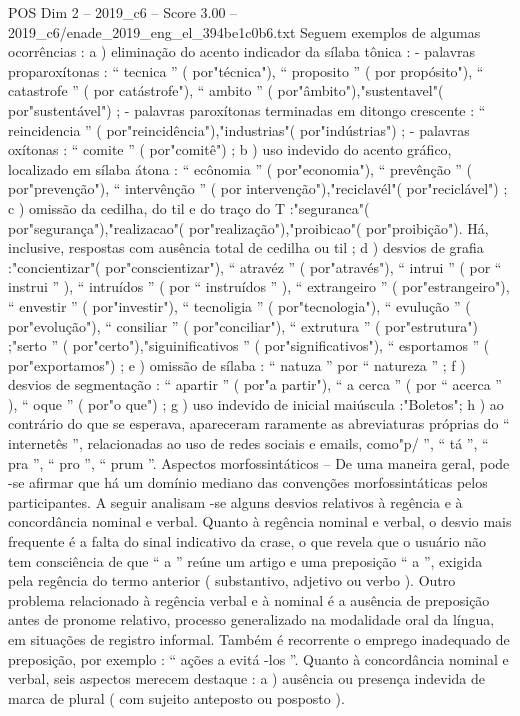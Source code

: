 \begin{textsample}{POS Dim 2 – 2019\_c6 – Score 3.00 – 2019\_c6/enade\_2019\_eng\_el\_394be1c0b6.txt}
Seguem exemplos de algumas ocorrências : a ) eliminação do acento indicador da sílaba tônica : - palavras proparoxítonas : “ tecnica ” ( por"técnica"), “ proposito ” ( por propósito"), “ catastrofe ” ( por catástrofe"), “ ambito ” ( por"âmbito"),"sustentavel"( por"sustentável") ; - palavras paroxítonas terminadas em ditongo crescente : “ reincidencia ” ( por"reincidência"),"industrias"( por"indústrias") ; - palavras oxítonas : “ comite ” ( por"comitê") ; b ) uso indevido do acento gráfico, localizado em sílaba átona : “ ecônomia ” ( por"economia"), “ prevênção ” ( por"prevenção"), “ intervênção ” ( por intervenção"),"reciclavél"( por"reciclável") ; c ) omissão da cedilha, do til e do traço do T :"seguranca"( por"segurança"),"realizacao"( por"realização"),"proibicao"( por"proibição").
Há, inclusive, respostas com ausência total de cedilha ou til ; d ) desvios de grafia :"concientizar"( por"conscientizar"), “ atravéz ” ( por"através"), “ intrui ” ( por “ instrui ” ), “ intruídos ” ( por “ instruídos ” ), “ extrangeiro ” ( por"estrangeiro"), “ envestir ” ( por"investir"), “ tecnoligia ” ( por"tecnologia"), “ evulução ” ( por"evolução"), “ consiliar ” ( por"conciliar"), “ extrutura ” ( por"estrutura") ;"serto ” ( por"certo"),"siguinificativos ” ( por"significativos"), “ esportamos ” ( por"exportamos") ; e ) omissão de sílaba : “ natuza ” por “ natureza ” ; f ) desvios de segmentação : “ apartir ” ( por"a partir"), “ a cerca ” ( por “ acerca ” ), “ oque ” ( por"o que") ; g ) uso indevido de inicial maiúscula :"Boletos"; h ) ao contrário do que se esperava, apareceram raramente as abreviaturas próprias do “ internetês ”, relacionadas ao uso de redes sociais e emails, como"p/ ”, “ tá ”, “ pra ”, “ pro ”, “ prum ”.
Aspectos morfossintáticos – De uma maneira geral, pode -se afirmar que há um domínio mediano das convenções morfossintáticas pelos participantes.
A seguir analisam -se alguns desvios relativos à regência e à concordância nominal e verbal.
Quanto à regência nominal e verbal, o desvio mais frequente é a falta do sinal indicativo da crase, o que revela que o usuário não tem consciência de que “ a ” reúne um artigo e uma preposição “ a ”, exigida pela regência do termo anterior ( substantivo, adjetivo ou verbo ).
Outro problema relacionado à regência verbal e à nominal é a ausência de preposição antes de pronome relativo, processo generalizado na modalidade oral da língua, em situações de registro informal.
Também é recorrente o emprego inadequado de preposição, por exemplo : “ ações a evitá -los ”.
Quanto à concordância nominal e verbal, seis aspectos merecem destaque : a ) ausência ou presença indevida de marca de plural ( com sujeito anteposto ou posposto ).

\end{textsample}

